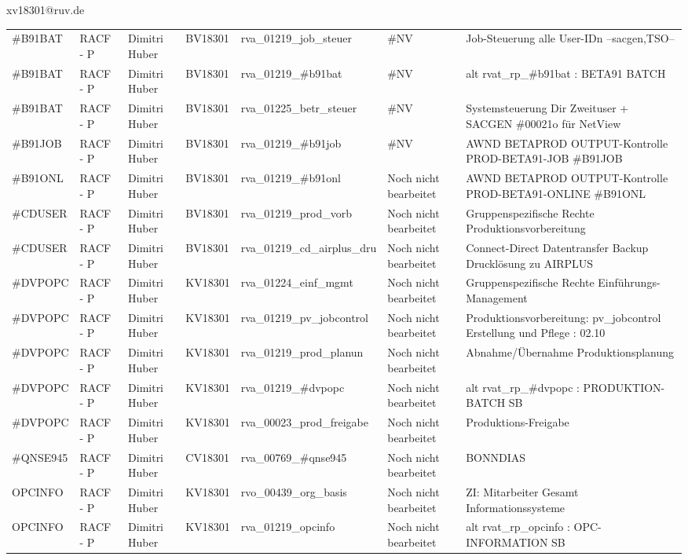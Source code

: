 \documentclass[a4paper,landscape,12pt]{letter}
\begin{document}
\begin{letter}{xv18301@ruv.de\hfill \break}
\begin{tiny}
\begin{longtable}{|p{35mm}|p{15mm}|p{25mm}|p{10mm}|p{40mm}|p{50mm}|p{50mm}|}
\#B91BAT & RACF - P & Dimitri Huber & BV18301 & rva\_01219\_job\_steuer & \#NV & Job-Steuerung alle User-IDn --sacgen,TSO-- \\
\#B91BAT & RACF - P & Dimitri Huber & BV18301 & rva\_01219\_\#b91bat & \#NV & alt rvat\_rp\_\#b91bat          : BETA91 BATCH \\
\#B91BAT & RACF - P & Dimitri Huber & BV18301 & rva\_01225\_betr\_steuer & \#NV & Systemsteuerung Dir Zweituser + SACGEN \#00021o für NetView \\
\#B91JOB & RACF - P & Dimitri Huber & BV18301 & rva\_01219\_\#b91job & \#NV & AWND BETAPROD OUTPUT-Kontrolle PROD-BETA91-JOB \#B91JOB \\
\#B91ONL & RACF - P & Dimitri Huber & BV18301 & rva\_01219\_\#b91onl & Noch nicht bearbeitet & AWND BETAPROD OUTPUT-Kontrolle PROD-BETA91-ONLINE \#B91ONL \\
\#CDUSER & RACF - P & Dimitri Huber & BV18301 & rva\_01219\_prod\_vorb & Noch nicht bearbeitet & Gruppenspezifische Rechte Produktionsvorbereitung \\
\#CDUSER & RACF - P & Dimitri Huber & BV18301 & rva\_01219\_cd\_airplus\_dru & Noch nicht bearbeitet & Connect-Direct Datentransfer Backup Drucklösung zu AIRPLUS \\
\#DVPOPC & RACF - P & Dimitri Huber & KV18301 & rva\_01224\_einf\_mgmt & Noch nicht bearbeitet & Gruppenspezifische Rechte Einführungs-Management \\
\#DVPOPC & RACF - P & Dimitri Huber & KV18301 & rva\_01219\_pv\_jobcontrol & Noch nicht bearbeitet & Produktionsvorbereitung: pv\_jobcontrol Erstellung und Pflege : 02.10 \\
\#DVPOPC & RACF - P & Dimitri Huber & KV18301 & rva\_01219\_prod\_planun & Noch nicht bearbeitet & Abnahme/Übernahme Produktionsplanung \\
\#DVPOPC & RACF - P & Dimitri Huber & KV18301 & rva\_01219\_\#dvpopc & Noch nicht bearbeitet & alt rvat\_rp\_\#dvpopc          : PRODUKTION-BATCH SB \\
\#DVPOPC & RACF - P & Dimitri Huber & KV18301 & rva\_00023\_prod\_freigabe & Noch nicht bearbeitet & Produktions-Freigabe \\
\#QNSE945 & RACF - P & Dimitri Huber & CV18301 & rva\_00769\_\#qnse945 & Noch nicht bearbeitet & BONNDIAS \\
OPCINFO & RACF - P & Dimitri Huber & KV18301 & rvo\_00439\_org\_basis & Noch nicht bearbeitet & ZI: Mitarbeiter Gesamt Informationssysteme \\
OPCINFO & RACF - P & Dimitri Huber & KV18301 & rva\_01219\_opcinfo & Noch nicht bearbeitet & alt rvat\_rp\_opcinfo          : OPC- INFORMATION                         SB \\

\end{longtable}
\end{tiny}
\end{letter}
\end{document}
